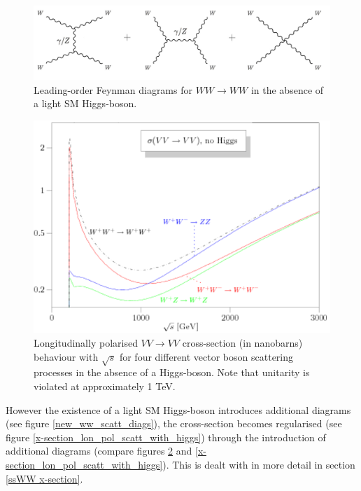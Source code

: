 \begin{figure}
\centering
\includegraphics[width=1.\textwidth]{images/ssWW/ww_scatt_diags.png}
\caption{Leading-order Feynman diagrams for $WW \longrightarrow WW$ in the absence of a light SM Higgs-boson.}
\label{ww_scatt_diags}
\end{figure}
\begin{figure}
\centering
\includegraphics[width=.65\textwidth]{images/ssWW/x-section_lon_pol_scatt_no_higgs.png}
\caption{Longitudinally polarised $VV \longrightarrow VV$ cross-section (in nanobarns) behaviour with $\sqrt{s}$ for four different vector boson scattering processes in the absence of a Higgs-boson. Note that unitarity is violated at approximately 1 TeV. \cite{Alboteanu}}
\label{x-section_lon_pol_scatt_no_higgs}
\end{figure}

However the existence of a light SM Higgs-boson introduces additional diagrams (see figure \ref{new_ww_scatt_diags}), the cross-section becomes regularised \cite{ssWW} (see figure \ref{x-section_lon_pol_scatt_with_higgs}) through the introduction of additional diagrams (compare figures \ref{x-section_lon_pol_scatt_no_higgs} and \ref{x-section_lon_pol_scatt_with_higgs}). This is dealt with in more detail in section \ref{ssWW x-section}.

